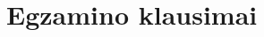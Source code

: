 \chapter{Egzamino klausimai}

\setcounter{questioncounter}{0}
\newenvironment{question}[2]
{
\refstepcounter{questioncounter}
\thequestioncounter{}. \hspace{3em}\emph{#1}\\
\label{#2}
}
{}

